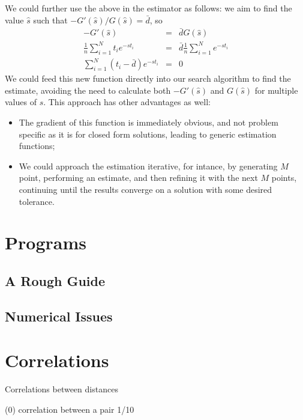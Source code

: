 \documentclass{article}
\begin{document}
We could further use the above in the estimator as follows: we aim to
find the value $\hat{s}$ such that $-G'(\hat{s})/G(\hat{s}) = \bar{d}$,
so 
\begin{eqnarray*}
  -G'(\hat{s}) & = & \bar{d} G(\hat{s}) \\
  \frac{1}{n} \sum_{i=1}^{N} t_i e^{-s t_i}    & = & \bar{d} \frac{1}{n} \sum_{i=1}^{N} e^{-s t_i} \\
  \sum_{i=1}^{N} (t_i - \bar{d} ) e^{-s t_i}  & = & 0
\end{eqnarray*}
We could feed this new function directly into our search algorithm to
find the estimate, avoiding the need to calculate both $-G'(\hat{s})$
and $G(\hat{s})$ for multiple values of $s$. This approach has other
advantages as well:
\begin{itemize}

\item The gradient of this function is immediately obvious, and not
  problem specific as it is for closed form solutions, leading to
  generic estimation functions;

\item We could approach the estimation iterative, for intance, by
  generating $M$ point, performing an estimate, and then refining it
  with the next $M$ points, continuing until the results converge on a
  solution with some desired tolerance.

\end{itemize}



\section{Programs}
\label{sec:program}

\subsection{A Rough Guide}

\subsection{Numerical Issues}


\section{Correlations}

Correlations between distances \cite{bartlett64}

(0) correlation between a pair 1/10
\end{document}
